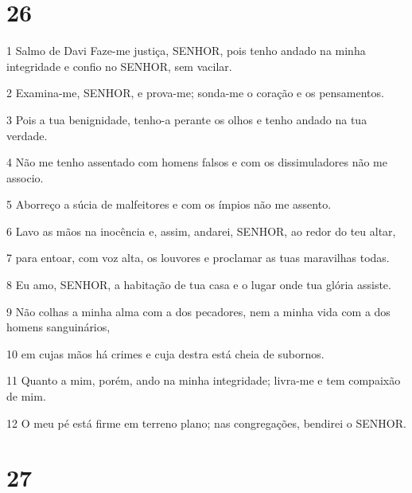 \chapter{26}

\par 1 Salmo de Davi Faze-me justiça, SENHOR, pois tenho andado na minha integridade e confio no SENHOR, sem vacilar.
\par 2 Examina-me, SENHOR, e prova-me; sonda-me o coração e os pensamentos.
\par 3 Pois a tua benignidade, tenho-a perante os olhos e tenho andado na tua verdade.
\par 4 Não me tenho assentado com homens falsos e com os dissimuladores não me associo.
\par 5 Aborreço a súcia de malfeitores e com os ímpios não me assento.
\par 6 Lavo as mãos na inocência e, assim, andarei, SENHOR, ao redor do teu altar,
\par 7 para entoar, com voz alta, os louvores e proclamar as tuas maravilhas todas.
\par 8 Eu amo, SENHOR, a habitação de tua casa e o lugar onde tua glória assiste.
\par 9 Não colhas a minha alma com a dos pecadores, nem a minha vida com a dos homens sanguinários,
\par 10 em cujas mãos há crimes e cuja destra está cheia de subornos.
\par 11 Quanto a mim, porém, ando na minha integridade; livra-me e tem compaixão de mim.
\par 12 O meu pé está firme em terreno plano; nas congregações, bendirei o SENHOR.

\chapter{27}

